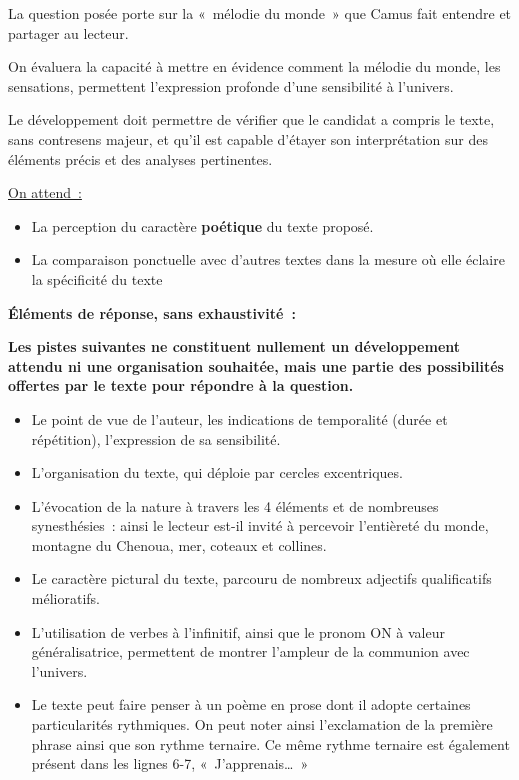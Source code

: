 {La question posée porte sur la «~mélodie du monde~» que Camus fait entendre et partager au
lecteur.

On évaluera la capacité à mettre en évidence comment la mélodie du monde, les sensations,
permettent l'expression profonde d'une sensibilité à l'univers.

Le développement doit permettre de vérifier que le candidat a compris le texte, sans contresens
majeur, et qu'il est capable d'étayer son interprétation sur des éléments précis et des analyses
pertinentes.

\underline{On attend~:}

\begin{itemize}
\item La perception du caractère \textbf{poétique} du texte proposé.
\item La comparaison ponctuelle avec d'autres textes dans la mesure où elle éclaire la spécificité
du texte
\end{itemize}

\bigskip

\textbf{Éléments de réponse, sans exhaustivité~:}

\textbf{Les pistes suivantes ne constituent nullement un développement attendu ni une organisation
souhaitée, mais une partie des possibilités offertes par le texte pour répondre à la question.}

\begin{itemize}
\item Le point de vue de l'auteur, les indications de temporalité (durée et répétition), l'expression
de sa sensibilité.
\item L'organisation du texte, qui déploie par cercles excentriques.
\item L'évocation de la nature à travers les 4 éléments et de nombreuses synesthésies~: ainsi le
lecteur est-il invité à percevoir l'entièreté du monde, montagne du Chenoua, mer, coteaux
et collines.
\item Le caractère pictural du texte, parcouru de nombreux adjectifs qualificatifs mélioratifs.
\item L'utilisation de verbes à l'infinitif, ainsi que le pronom ON à valeur généralisatrice,
permettent de montrer l'ampleur de la communion avec l'univers.
\item Le texte peut faire penser à un poème en prose dont il adopte certaines particularités
rythmiques. On peut noter ainsi l'exclamation de la première phrase ainsi que son rythme
ternaire. Ce même rythme ternaire est également présent dans les lignes 6-7,
«~J'apprenais…~»
\end{itemize}

}
